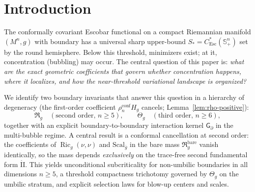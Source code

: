 \documentclass[11pt,reqno,a4paper]{amsart}
\DeclareMathOperator{\Ric}{Ric}
\numberwithin{equation}{section}
\theoremstyle{plain}
\newcommand{\Scal}{\mathrm{Scal}}
\theoremstyle{remark}
\theoremstyle{plain}
\begin{document}
\begin{abstract}
In the multi-bubble regime ($k\ge2$) we derive a weighted reduced functional with
a Green-kernel interaction channel through $\mathsf G_\partial$ (the signed
dimensional coefficient $c_n^{\mathrm{conf}}$ is left unevaluated;
Remark~\ref{rem:green-coefficient-status}),
and a differentiated refinement yields a conditional exclusion criterion for
pure multi-bubbling (Theorem~\ref{thm:no-pure-kge2-from-J1}).
We also establish global compactness at Escobar multiples $k^{1-2/q}S_\ast$
with equal-mass quantization.
In the fully degenerate case, conformal hemispherical rigidity follows under
standard geometric hypotheses.
\end{abstract}


\maketitle


\tableofcontents

\section{Introduction}


The conformally covariant Escobar functional on a compact Riemannian manifold $(M^n,g)$ with boundary
has a universal sharp upper-bound $S_\ast = C^*_{\mathrm{Esc}}(\mathbb S^n_+)$ set by the round hemisphere.
Below this threshold, minimizers exist; at it, concentration (bubbling) may occur.
The central question of this paper is: \emph{what are the exact geometric coefficients that govern
whether concentration happens, where it localizes, and how the near-threshold variational landscape
is organized?}

We identify two boundary invariants that answer this question in a hierarchy of degeneracy
(the first-order coefficient $\rho_n^{\mathrm{conf}}H_g$ cancels; Lemma~\ref{lem:rho-positive}):
\[
\mathfrak R_g\quad(\text{second order, }n\ge5),\qquad
\Theta_g\quad(\text{third order, }n\ge6),
\]
together with an explicit boundary-to-boundary interaction kernel $\mathsf G_\partial$
in the multi-bubble regime.
A central result is a conformal cancellation at second order:
the coefficients of $\Ric_g(\nu,\nu)$ and $\Scal_{\bar g}$ in the
bare mass $\mathfrak R_g^{\mathrm{bare}}$ vanish identically, so the mass depends
\emph{exclusively} on the trace-free second fundamental form $\mathring{\mathrm{II}}$.
This yields unconditional subcriticality for non-umbilic boundaries in all dimensions $n\ge5$,
a threshold compactness trichotomy governed by $\Theta_g$ on the umbilic stratum,
and explicit selection laws for blow-up centers and scales.
\end{document}
